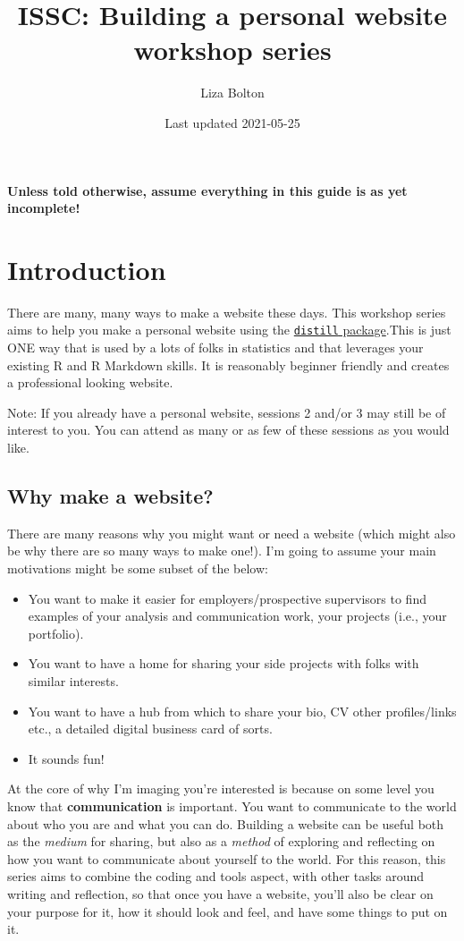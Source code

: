 \documentclass[
]{article}
\title{ISSC: Building a personal website workshop series}
\author{Liza Bolton}
\date{Last updated 2021-05-25}
\providecommand{\tightlist}{%
  \setlength{\itemsep}{0pt}\setlength{\parskip}{0pt}}
\begin{document}
\maketitle

{
\setcounter{tocdepth}{2}
\tableofcontents
}
\textbf{Unless told otherwise, assume everything in this guide is as yet incomplete!}

\hypertarget{introduction}{%
\section{Introduction}\label{introduction}}

There are many, many ways to make a website these days. This workshop series aims to help you make a personal website using the \href{https://rstudio.github.io/distill/}{\texttt{distill} package}.This is just ONE way that is used by a lots of folks in statistics and that leverages your existing R and R Markdown skills. It is reasonably beginner friendly and creates a professional looking website.

Note: If you already have a personal website, sessions 2 and/or 3 may still be of interest to you. You can attend as many or as few of these sessions as you would like.

\hypertarget{why-make-a-website}{%
\subsection{Why make a website?}\label{why-make-a-website}}

There are many reasons why you might want or need a website (which might also be why there are so many ways to make one!). I'm going to assume your main motivations might be some subset of the below:

\begin{itemize}
\tightlist
\item
  You want to make it easier for employers/prospective supervisors to find examples of your analysis and communication work, your projects (i.e., your portfolio).
\item
  You want to have a home for sharing your side projects with folks with similar interests.
\item
  You want to have a hub from which to share your bio, CV other profiles/links etc., a detailed digital business card of sorts.
\item
  It sounds fun!
\end{itemize}

At the core of why I'm imaging you're interested is because on some level you know that \textbf{communication} is important. You want to communicate to the world about who you are and what you can do. Building a website can be useful both as the \emph{medium} for sharing, but also as a \emph{method} of exploring and reflecting on how you want to communicate about yourself to the world. For this reason, this series aims to combine the coding and tools aspect, with other tasks around writing and reflection, so that once you have a website, you'll also be clear on your purpose for it, how it should look and feel, and have some things to put on it.
\end{document}
